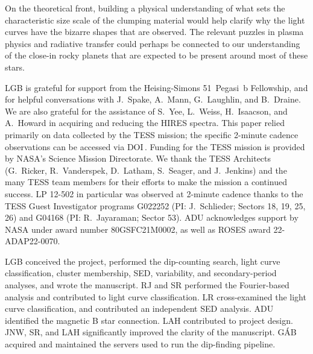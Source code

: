 \documentclass[11pt,twocolumn,tighten]{aastex63}
\begin{document}
On the theoretical front, building a physical understanding of what
sets the characteristic size scale of the clumping material would help
clarify why the light curves have the bizarre shapes that are
observed.  The relevant puzzles in plasma physics and radiative
transfer could perhaps be connected to our understanding of the
close-in rocky planets that are expected to be present around most of
these stars.



\acknowledgments
LGB is grateful for support from the Heising-Simons 51~Pegasi~b
Fellowship, and for helpful conversations with J.~Spake, A.~Mann,
G.~Laughlin, and B.~Draine.  
We are also grateful for the assistance of S.~Yee, L.~Weiss,
H.~Isaacson, and A.~Howard in acquiring and reducing the HIRES
spectra.
This paper relied primarily on data collected by the TESS mission; the
specific 2-minute cadence observations can be accessed via
DOI\,.
Funding for the TESS mission is provided by NASA’s Science Mission
Directorate.  
We thank the TESS Architects (G.~Ricker, R.~Vanderspek, D.~Latham,
S.~Seager, and J.~Jenkins) and the many TESS team members for their
efforts to make the mission a continued success. 
LP 12-502 in particular was observed at 2-minute cadence thanks to the
TESS Guest Investigator programs G022252 (PI: J.~Schlieder; Sectors
18, 19, 25, 26) and G04168 (PI: R.~Jayaraman; Sector 53). 
ADU acknowledges support by NASA under award number 80GSFC21M0002, as
well as ROSES award 22-ADAP22-0070.

LGB conceived the project, performed the dip-counting search, light curve classification, cluster membership, SED, variability, and secondary-period analyses, and wrote the manuscript.
RJ and SR performed the Fourier-based analysis and contributed to light curve classification.
LR cross-examined the light curve classification, and contributed an independent SED analysis.
ADU identified the magnetic B star connection.
LAH contributed to project design.
JNW, SR, and LAH significantly improved the clarity of the manuscript.
G\'AB acquired and maintained the servers used to run the dip-finding pipeline.

\end{document}
